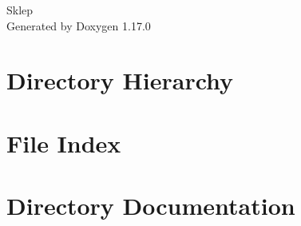 \documentclass[twoside]{book}
\newcommand{\+}{\discretionary{\mbox{\scriptsize$\hookleftarrow$}}{}{}}
\newcommand{\clearemptydoublepage}{%
    \newpage{\pagestyle{empty}\cleardoublepage}%
  }
\begin{document}
  \raggedbottom
    \hypersetup{pageanchor=false,
                bookmarksnumbered=true,
                pdfencoding=unicode
               }
  \begin{titlepage}
  \vspace*{7cm}
  \begin{center}%
  {\Large Sklep}\\
  \vspace*{1cm}
  {\large Generated by Doxygen 1.17.0}\\
  \end{center}
  \end{titlepage}
  \clearemptydoublepage
  \tableofcontents
  \clearemptydoublepage
  \hypersetup{pageanchor=true}
\chapter{Directory Hierarchy}

\chapter{File Index}

\chapter{Directory Documentation}



























\end{document}
